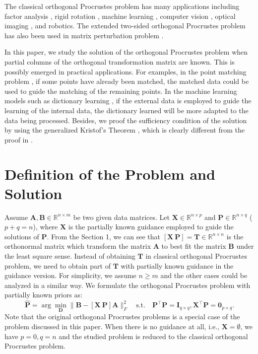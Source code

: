 \documentclass[titlepage,11pt,twoside]{article}
\let\oldemptyset\emptyset
\let\emptyset\varnothing
\begin{document}
The classical orthogonal Procrustes problem \cite{procrustesprogram} has many applications including factor analysis \cite{green1952orthogonal}, rigid rotation \cite{Berge2006}, machine learning \cite{zou2006sparse}, computer vision \cite{zhang2000flexible,pointpatterns}, optical imaging , and robotics. The extended two-sided orthogonal Procrustes problem has also been used in matrix perturbation problem \cite{schonemann1968two}. 

In this paper, we study the solution of the orthogonal Procrustes problem when partial columns of the orthogonal transformation matrix are known. This is possibly emerged in practical applications. For examples, in the point matching problem \cite{pointpatterns}, if some points have already been matched, the matched data could be used to guide the matching of the remaining points. In the machine learning models such as dictionary learning \cite{aharon2006img}, if the external data is employed to guide the learning of the internal data, the dictionary learned will be more adapted to the data being processed. Besides, we proof the sufficiency condition of the solution by using the generalized Kristof's Theorem \cite{TenBerge1983}, which is clearly different from the proof in \cite{schonemann1966generalized}.

\section{Definition of the Problem and Solution}
Assume $\mathbf{A},\mathbf{B}\in \mathbb{R}^{n\times m}$ be two given data matrices. Let $\mathbf{X}\in\mathbb{R}^{n\times p}$ and $\mathbf{P}\in\mathbb{R}^{n\times q}$ ($p+q=n$), where $\mathbf{X}$ is the partially known guidance employed to guide the solutions of $\mathbf{P}$. From the Section 1, we can see that $[\mathbf{X}\ \mathbf{P}]=\mathbf{T}\in\mathbb{R}^{n\times n}$ is the orthonormal matrix which transform the matrix $\mathbf{A}$ to best fit the matrix $\mathbf{B}$ under the least square sense. Instead of obtaining $\mathbf{T}$ in classical orthogonal Procrustes problem, we need to obtain part of $\mathbf{T}$ with partially known guidance in the guidance version. For simplicity, we assume $n\ge m$ and the other cases could be analyzed in a similar way. We formulate the orthogonal Procrustes problem with partially known priors as:
\begin{equation}
\mathbf{\hat{P}}=\arg\min_{\mathbf{D}}\|\mathbf{B}-[\mathbf{X}\ \mathbf{P}]\mathbf{A}\|_{F}^{2}
\quad
\text{s.t.}
\quad
\mathbf{P}^{\top}\mathbf{P} = \mathbf{I}_{q\times q}, \mathbf{X}^{\top}\mathbf{P} = \mathbf{0}_{p\times q}.
\end{equation} 
Note that the original orthogonal Procrustes problems is a special case of the problem discussed in this paper. When there is no guidance at all, i.e., $\mathbf{X}=\oldemptyset$, we have $p=0,q=n$ and the studied problem is reduced to the classical orthogonal Procrustes problem.
\end{document}
